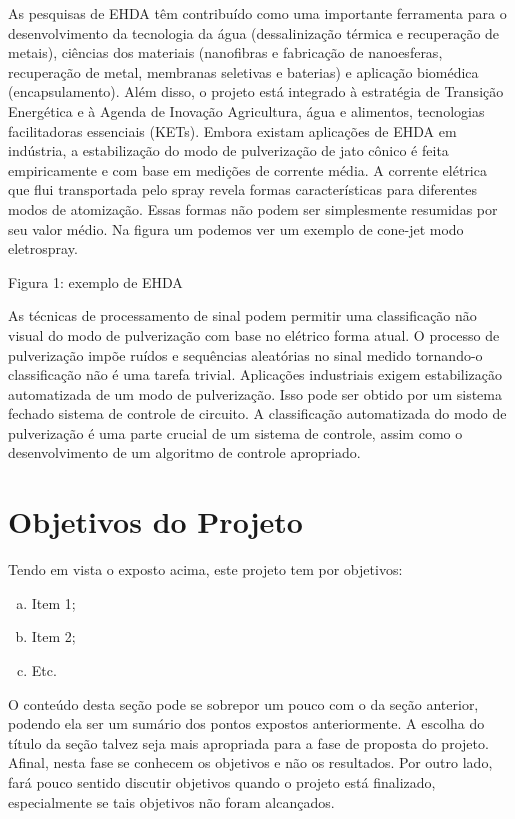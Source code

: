 As pesquisas de EHDA têm contribuído como uma importante ferramenta para
o desenvolvimento da tecnologia da água (dessalinização térmica e recuperação de metais), ciências dos materiais (nanofibras e
fabricação de nanoesferas, recuperação de metal, membranas seletivas e baterias) e aplicação biomédica
(encapsulamento). Além disso, o projeto está integrado à estratégia de Transição Energética e à Agenda de Inovação
Agricultura, água e alimentos, tecnologias facilitadoras essenciais (KETs). Embora existam aplicações de EHDA em
indústria, a estabilização do modo de pulverização de jato cônico é feita empiricamente e com base em medições de corrente média.
A corrente elétrica que flui transportada pelo spray revela formas características para diferentes modos de atomização.
Essas formas não podem ser simplesmente resumidas por seu valor médio. Na figura um podemos ver um exemplo de cone-jet
modo eletrospray.

Figura 1: exemplo de EHDA

As técnicas de processamento de sinal podem permitir uma classificação não visual do modo de pulverização com base no elétrico
forma atual. O processo de pulverização impõe ruídos e sequências aleatórias no sinal medido tornando-o
classificação não é uma tarefa trivial.
Aplicações industriais exigem estabilização automatizada de um modo de pulverização. Isso pode ser obtido por um sistema fechado
sistema de controle de circuito. A classificação automatizada do modo de pulverização é uma parte crucial de um sistema de controle, assim como
o desenvolvimento de um algoritmo de controle apropriado.

\section{Objetivos do Projeto}
\label{sec:objetivos}

Tendo em vista o exposto acima, este projeto tem por objetivos:

\begin{enumerate}[a)]
\item Item 1;
\item Item 2; 
\item Etc.     
\end{enumerate}

O conteúdo desta seção pode se sobrepor um pouco com o da seção anterior, podendo ela ser um sumário dos pontos expostos anteriormente. A escolha do título da seção talvez seja mais apropriada para a fase de proposta do projeto. Afinal, nesta fase se conhecem os objetivos e não os resultados. Por outro lado, fará pouco sentido discutir objetivos quando o projeto está finalizado, especialmente se tais objetivos não foram alcançados. 


